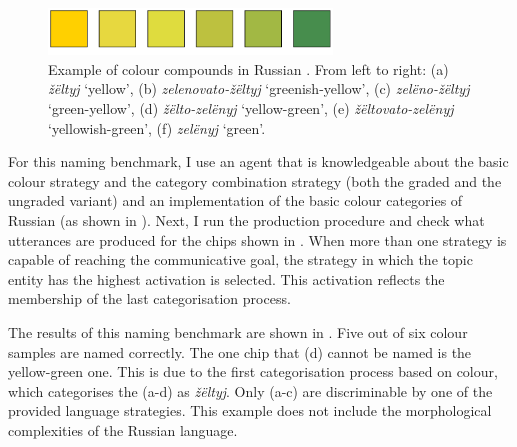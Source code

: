 \begin{figure}[htpb]
  \centering
  \includegraphics[height=1.25cm]{./category-combination/figures/russian-compounds.pdf}
  \caption[Example of colour compounds in Russian]{Example of colour
    compounds in Russian \citep{safuanova07russian}. From left to
    right: (a) \textit{\v z\"eltyj} `yellow', (b) \textit{zelenovato-\v z\"eltyj} 
    `greenish-yellow', (c) \textit{zel\"eno-\v z\"eltyj} `green-yellow',
    (d) \textit{\v z\"elto-zel\"enyj} `yellow-green', (e) \textit{\v z\"eltovato-zel\"enyj}
    `yellowish-green', (f) \textit{zel\"enyj} `green'.}
  \label{f:ccs-russian-compounds}
\end{figure}

For this naming benchmark, 
I use an agent that is knowledgeable about
the basic colour strategy and the category combination
  strategy (both the graded and the ungraded variant) and an implementation of the
basic colour categories of Russian (as shown in ). Next, I run the production procedure and
check what utterances are produced for the chips shown in . When more than one strategy is capable
of reaching the communicative goal, the strategy in which the topic
entity has the highest activation is selected. This activation
reflects the membership of the last categorisation process.

The results of this naming benchmark are shown in . Five out of six colour samples
are named correctly. The one chip that (d) cannot be named is the
yellow-green one. This is due to the first categorisation process
based on colour, which categorises the (a-d) as \textit{\v z\"eltyj}. Only (a-c)
are discriminable by one of the provided language strategies. This
example does not include the morphological complexities of the Russian
language.

